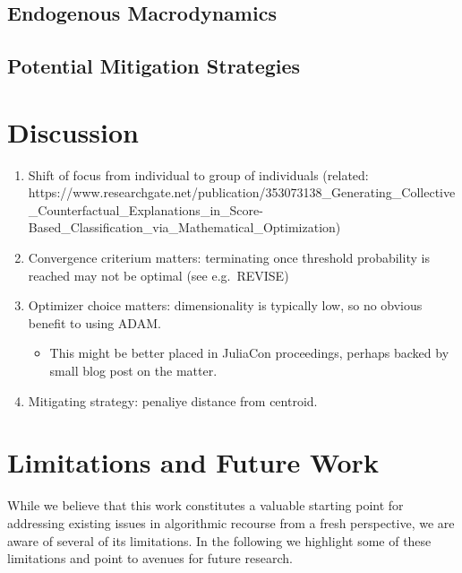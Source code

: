 \documentclass[
  conference]{IEEEtran}
\providecommand{\tightlist}{%
  \setlength{\itemsep}{0pt}\setlength{\parskip}{0pt}}\usepackage{longtable,booktabs,array}
\begin{document}
\hypertarget{endogenous-macrodynamics}{%
\subsection{Endogenous Macrodynamics}\label{endogenous-macrodynamics}}

\hypertarget{potential-mitigation-strategies}{%
\subsection{Potential Mitigation
Strategies}\label{potential-mitigation-strategies}}

\hypertarget{sec-discussion}{%
\section{Discussion}\label{sec-discussion}}

\begin{enumerate}
\def\labelenumi{\arabic{enumi}.}
\tightlist
\item
  Shift of focus from individual to group of individuals (related:
  https://www.researchgate.net/publication/353073138\_Generating\_Collective\_Counterfactual\_Explanations\_in\_Score-Based\_Classification\_via\_Mathematical\_Optimization)
\item
  Convergence criterium matters: terminating once threshold probability
  is reached may not be optimal (see e.g.~REVISE)
\item
  Optimizer choice matters: dimensionality is typically low, so no
  obvious benefit to using ADAM.

  \begin{itemize}
  \tightlist
  \item
    This might be better placed in JuliaCon proceedings, perhaps backed
    by small blog post on the matter.
  \end{itemize}
\item
  Mitigating strategy: penaliye distance from centroid.
\end{enumerate}

\hypertarget{sec-limit}{%
\section{Limitations and Future Work}\label{sec-limit}}

While we believe that this work constitutes a valuable starting point
for addressing existing issues in algorithmic recourse from a fresh
perspective, we are aware of several of its limitations. In the
following we highlight some of these limitations and point to avenues
for future research.
\end{document}
